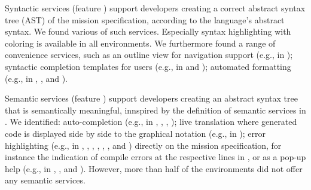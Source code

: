 
Syntactic services (feature \fsyntacticservices) support developers creating a correct abstract syntax tree (AST) of the mission specification, according to the language's abstract syntax. We found various of such services. Especially syntax highlighting with coloring is available in all environments.  %
We furthermore found a range of convenience services, such as an outline view for navigation support (e.g., in \picaxe); syntactic completion templates for users (e.g., in \edison and \ardublockly); automated formatting (e.g., in \arcbotics, \robotmesh, and \vex).




Semantic services (feature \fsemanticservices) support developers creating an abstract syntax tree that is semantically meaningful, innspired by the definition of semantic services in \citet{erdweg2013languageworkbenches}. We identified: auto-completion (e.g., in \vex, \trik, \picaxe, \edison);  live translation where generated code is displayed side by side to the graphical notation (e.g., in \easyc); error highlighting (e.g., in \edison, \aseba, \vex, \robotmesh, \blocklyprop, \minibloq, and \easyc) directly on the mission specification, for instance the indication of compile errors at the respective lines in \blocklyprop, or as a pop-up help (e.g., in \edison, \missionlab, and \choregraphe). However, more than half of the environments did not offer any semantic services. %


